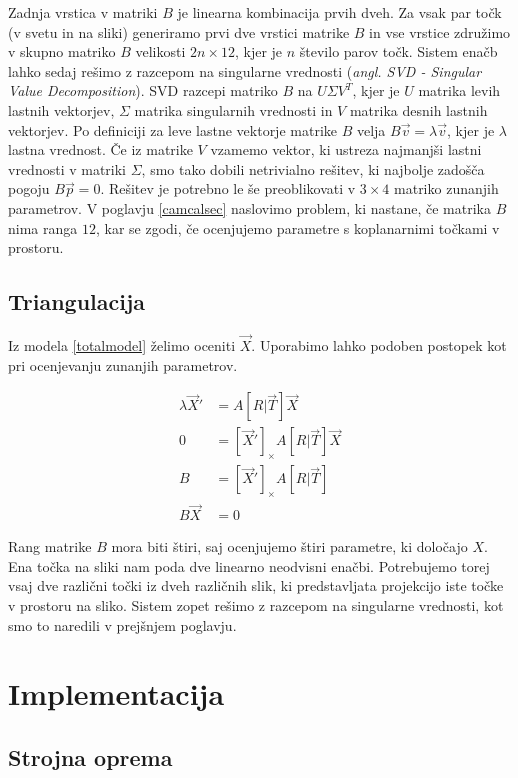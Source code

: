 \documentclass[a4paper, 12pt]{book}
\begin{document}
Zadnja vrstica v matriki $B$ je linearna kombinacija prvih dveh. Za vsak par točk (v svetu in na sliki) generiramo prvi dve vrstici matrike $B$ in vse vrstice združimo v skupno matriko $B$ velikosti $2n \times 12$, kjer je $n$ število parov točk. Sistem enačb lahko sedaj rešimo z razcepom na singularne vrednosti (\emph{angl. SVD - Singular Value Decomposition}). SVD razcepi matriko $B$ na $U \Sigma V^T$, kjer je $U$ matrika levih lastnih vektorjev, $\Sigma$ matrika singularnih vrednosti in $V$ matrika desnih lastnih vektorjev. Po definiciji za leve lastne vektorje matrike $B$ velja $B \vec{v} = \lambda \vec{v}$, kjer je $\lambda$ lastna vrednost. Če iz matrike $V$ vzamemo vektor, ki ustreza najmanjši lastni vrednosti v matriki $\Sigma$, smo tako dobili netrivialno rešitev, ki najbolje zadošča pogoju $B \vec{p} = 0$. Rešitev je potrebno le še preoblikovati v $3 \times 4$ matriko zunanjih parametrov. V poglavju \ref{camcalsec} naslovimo problem, ki nastane, če matrika $B$ nima ranga $12$, kar se zgodi, če ocenjujemo parametre s koplanarnimi točkami v prostoru.

\section{Triangulacija}

Iz modela \eqref{totalmodel} želimo oceniti $\vec{X}$. Uporabimo lahko podoben postopek kot pri ocenjevanju zunanjih parametrov.

\begin{align}
\lambda \vec{X}' &= A[R | \vec{T}] \vec{X} \\
0 &= [\vec{X}']_{\times} A[R | \vec{T}] \vec{X} \\
B &= [\vec{X}']_{\times} A[R | \vec{T}] \\
B \vec{X} &= 0
\end{align}

Rang matrike $B$ mora biti štiri, saj ocenjujemo štiri parametre, ki določajo $X$. Ena točka na sliki nam poda dve linearno neodvisni enačbi. Potrebujemo torej vsaj dve različni točki iz dveh različnih slik, ki predstavljata projekcijo iste točke v prostoru na sliko. Sistem zopet rešimo z razcepom na singularne vrednosti, kot smo to naredili v prejšnjem poglavju.

\chapter{Implementacija}

\section{Strojna oprema}
\end{document}
